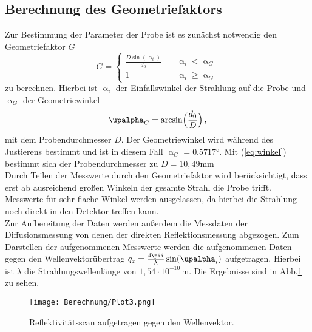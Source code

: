\subsection{Berechnung des Geometriefaktors}
Zur Bestimmung der Parameter der Probe ist es zunächst notwendig den Geometriefaktor $G$
\begin{equation}
  G =
     \begin{cases}
       \frac{D\sin\left(\upalpha_i\right)}{d_0} &\quad\upalpha_i<\upalpha_G\\
       1 &\quad\upalpha_i\geq\upalpha_G
     \end{cases}
\end{equation}
zu berechnen. Hierbei ist $\upalpha_i$ der Einfallswinkel der Strahlung auf die Probe und $\upalpha_G$ der Geometriewinkel
\begin{equation}
\upalpha_G=\arcsin\Bigl(\frac{d_0}{D}\Bigr)\,,
\label{eq:winkel}
\end{equation}
mit dem Probendurchmesser $D$.
Der Geometriewinkel wird während des Justierens bestimmt und ist in diesem Fall $\upalpha_G=0.5717°$.
Mit (\ref{eq:winkel}) bestimmt sich der Probendurchmesser zu $D=10{,}49\si{\mm}$\\
Durch Teilen der Messwerte durch den Geometriefaktor wird berücksichtigt, dass erst ab ausreichend großen Winkeln der gesamte Strahl die Probe trifft. Messwerte für sehr flache Winkel werden ausgelassen, da hierbei die Strahlung noch direkt in den Detektor treffen kann.\\
Zur Aufbereitung der Daten werden außerdem die Messdaten der Diffusionsmessung von denen der direkten Reflektionsmessung abgezogen. Zum Darstellen der aufgenommenen Messwerte werden die aufgenommenen Daten gegen den Wellenvektorübertrag $q_z=\frac{4\pii}{\lambda}\sin(\upalpha_i)$ aufgetragen. Hierbei ist $\lambda$ die Strahlungswellenlänge von $1{,}54\cdot10^{-10}\,\si{\m}$. Die Ergebnisse sind in Abb.\ref{Plot1} zu sehen.
\begin{figure}[H]
  \centering
  \texttt{[image: Berechnung/Plot3.png]}
  \caption{Reflektivitätsscan aufgetragen gegen den Wellenvektor.}
  \label{Plot1}
\end{figure}
